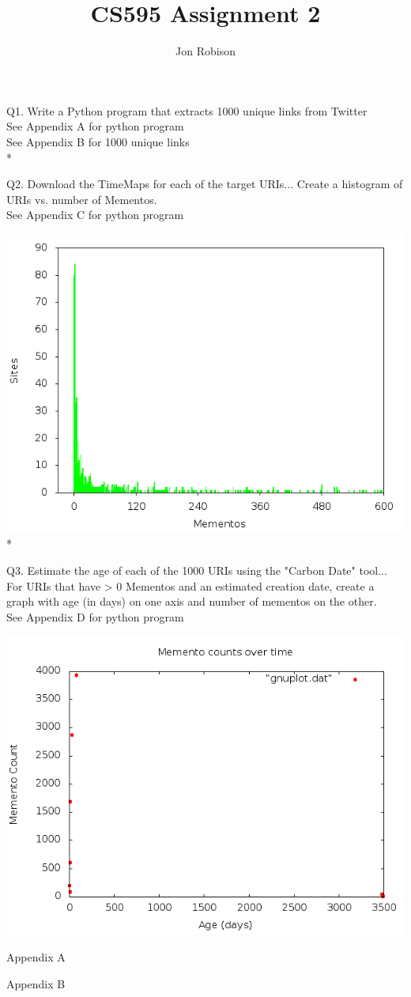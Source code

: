 \documentclass{article}
\begin{document}
\author{Jon Robison}
\title{CS595 Assignment 2}
\maketitle

Q1. Write a Python program that extracts 1000 unique links from Twitter \\
See Appendix A for python program \\
See Appendix B for 1000 unique links
\\*

Q2. Download the TimeMaps for each of the target URIs... Create a histogram of
URIs vs. number of Mementos. \\
See Appendix C for python program \\
\graphicspath{{q2/}}
\includegraphics[scale=.4]{histogram.png}
\\*

Q3. Estimate the age of each of the 1000 URIs using the "Carbon Date" tool...
For URIs that have > 0 Mementos and an estimated creation date, create a graph
with age (in days) on one axis and number of mementos on the other. \\
See Appendix D for python program \\
\graphicspath{{q3/}}
\includegraphics[scale=.4]{ageMementoCount.png}

\newpage
\appendix
Appendix A
%

\newpage
Appendix B
%
\end{document}
